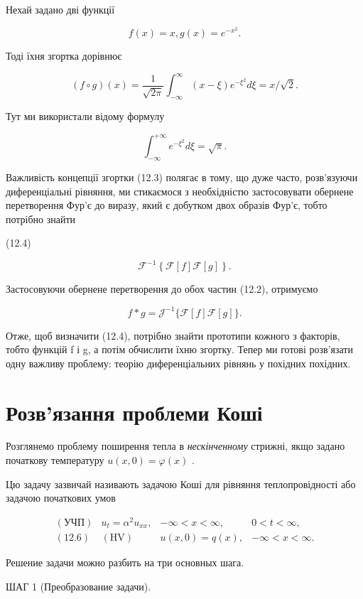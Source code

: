 \documentclass[
  ukrainian,
]{article}
\begin{document}
Нехай задано дві функції

\[
f(x) = x,
g(x) = e^{-x^2}.
\]

Тоді їхня згортка дорівнює

\[
(f \circ g)(x) = \frac{1}{\sqrt{2\pi}} \int_{-\infty}^{\infty} (x - \xi) e^{-\xi^2} d\xi = x/\sqrt{2}.
\]

Тут ми використали відому формулу

\[
\int_{-\infty}^{+\infty} e^{-\xi^2} d\xi = \sqrt{\pi}.
\]

Важливість концепції згортки (12.3) полягає в тому, що дуже часто,
розв'язуючи диференціальні рівняння, ми стикаємося з необхідністю
застосовувати обернене перетворення Фур'є до виразу, який є добутком
двох образів Фур'є, тобто потрібно знайти

(12.4)

\[
\mathcal{F}^{-1}\left\{\mathcal{F}\left[f\right]\mathcal{F}\left[g\right]\right\}.
\]

Застосовуючи обернене перетворення до обох частин (12.2), отримуємо

\[
f * g = \mathcal{J}^{-1} \{ \mathcal{F} [f] \mathcal{F} [g] \}.
\]

Отже, щоб визначити (12.4), потрібно знайти прототипи кожного з
факторів, тобто функцій f і g, а потім обчислити їхню згортку. Тепер ми
готові розв'язати одну важливу проблему: теорію диференціальних рівнянь
у похідних похідних.

\section{Розв'язання проблеми
Коші}\label{ux440ux43eux437ux432ux44fux437ux430ux43dux43dux44f-ux43fux440ux43eux431ux43bux435ux43cux438-ux43aux43eux448ux456}

Розглянемо проблему поширення тепла в \emph{нескінченному} стрижні, якщо
задано початкову температуру \(u(x, 0) = \varphi(x)\) .

Цю задачу зазвичай називають задачою Коші для рівняння теплопровідності
або задачою початкових умов

\[
\begin{array}{llll} (\text{УЧП}) & u_t = \alpha^2 u_{xx}, & -\infty < x < \infty, & 0 < t < \infty, \\ (\text{12.6}) & (\text{HV}) & u(x,0) = q(x), & -\infty < x < \infty. \end{array}
\]

Решение задачи можно разбить на три основных шага.

ШАГ 1 (Преобразование задачи).
\end{document}
